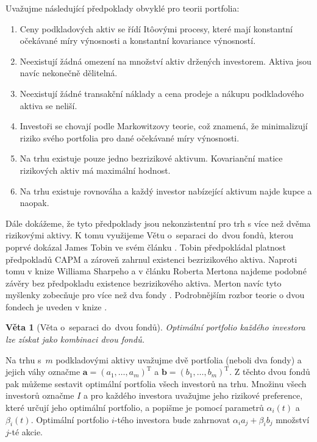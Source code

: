 \documentclass[a4paper,12pt]{report}
\newtheorem{veta}{Věta}
\theoremstyle{definition} \newtheorem{definice}[veta]{Definice}
\theoremstyle{remark}
\begin{document}
Uvažujme následující předpoklady obvyklé pro teorii portfolia:
\begin{enumerate}
\item \label{predpoklad_konstantnosti_vynosu_a_rizika} Ceny podkladových aktiv se řídí It\^oovými procesy, které mají konstantní očekávané míry výnosnosti a konstantní kovariance výnosností. 
\item Neexistují žádná omezení na množství aktiv držených investorem. Aktiva jsou navíc nekonečně dělitelná.
\item Neexistují žádné transakční náklady a cena prodeje a nákupu podkladového aktiva se neliší.
\item Investoři se chovají podle Markowitzovy teorie, což znamená, že minimalizují riziko svého portfolia pro dané očekávané míry výnosnosti.
\item \label{predpoklad_hodnost} Na trhu existuje pouze jedno bezrizikové aktivum. Kovarianční matice rizikových aktiv má maximální hodnost.
\item \label{predpoklad_konstantnosti_N} Na trhu existuje rovnováha a každý investor nabízející aktivum najde kupce a naopak.
\end{enumerate}

Dále dokážeme, že tyto předpoklady jsou nekonzistentní pro trh s více než dvěma rizikovými aktivy.
K tomu využijeme Větu o~separaci do~dvou fondů, kterou poprvé dokázal  James Tobin ve svém článku \cite{tobin}. 
Tobin předpokládal platnost předpokladů CAPM a zároveň zahrnul existenci bezrizikového aktiva.
Naproti tomu v knize Williama Sharpeho \cite{sharpe} a v článku Roberta Mertona \cite{merton} najdeme podobné závěry bez předpokladu existence bezrizikového aktiva.
Merton navíc tyto myšlenky zobecňuje pro více než dva fondy \cite{merton1973}.
Podrobnějším rozbor teorie o dvou fondech je uveden v knize \cite{cass1970structure}.
\begin{veta}[Věta o~separaci do~dvou fondů]
Optimální portfolio každého investora lze získat jako kombinaci dvou fondů.
\end{veta}

Na trhu s~$m$ podkladovými aktivy uvažujme dvě portfolia (neboli dva fondy) a jejich váhy označme $\boldsymbol{a}=(a_1,\dots,a_m)^\mathrm{T}$ a $\boldsymbol{b}=(b_1,\dots,b_m)^\mathrm{T}$. Z těchto dvou fondů pak můžeme sestavit optimální portfolia všech investorů na trhu.
Množinu všech investorů označme $I$ a pro každého investora uvažujme jeho rizikové preference, které určují jeho optimální portfolio, a popišme je pomocí parametrů $\alpha_i(t)$ a $\beta_i(t)$.
Optimální portfolio $i$-tého investora bude zahrnovat $\alpha_ia_j+\beta_ib_j$ množství $j$-té akcie.
\end{document}
